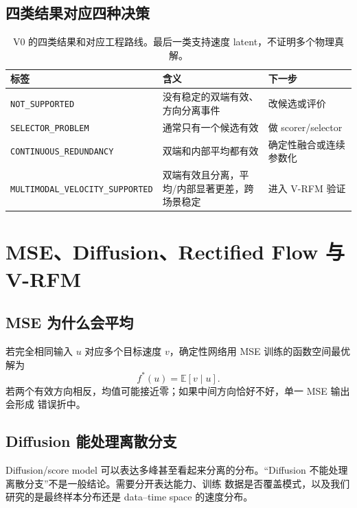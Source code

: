 \documentclass[UTF8,a4paper,11pt]{ctexart}
\begin{document}
\subsection{四类结果对应四种决策}

\begin{table}[htbp]
  \centering
  \small
  \begin{tabularx}{\textwidth}{>{\raggedright\arraybackslash}p{4.1cm}X X}
    \toprule
    \normalfont\bfseries 标签 & 含义 & 下一步 \\
    \midrule
    \texttt{NOT\_SUPPORTED} & 没有稳定的双端有效、方向分离事件 & 改候选或评价 \\
    \texttt{SELECTOR\_PROBLEM} & 通常只有一个候选有效 & 做 scorer/selector \\
    \texttt{CONTINUOUS\_}\newline\texttt{REDUNDANCY} & 双端和内部平均都有效 & 确定性融合或连续参数化 \\
    \texttt{MULTIMODAL\_}\newline\texttt{VELOCITY\_}\newline\texttt{SUPPORTED}
      & 双端有效且分离，平均/内部显著更差，跨场景稳定
      & 进入 V-RFM 验证 \\
    \bottomrule
  \end{tabularx}
  \caption{V0 的四类结果和对应工程路线。最后一类支持速度 latent，不证明多个物理真解。}
\end{table}

\section{MSE、Diffusion、Rectified Flow 与 V-RFM}

\subsection{MSE 为什么会平均}

若完全相同输入 $u$ 对应多个目标速度 $v$，确定性网络用 MSE 训练的函数空间最优解为
\begin{equation}
  f^*(u)=\mathbb E[v\mid u].
\end{equation}
若两个有效方向相反，均值可能接近零；如果中间方向恰好不好，单一 MSE 输出会形成
错误折中。

\subsection{Diffusion 能处理离散分支}

Diffusion/score model 可以表达多峰甚至看起来分离的分布\citep{ho2020denoising,
song2021score}。“Diffusion 不能处理离散分支”不是一般结论。需要分开表达能力、训练
数据是否覆盖模式，以及我们研究的是最终样本分布还是 data--time space 的速度分布。
\end{document}
